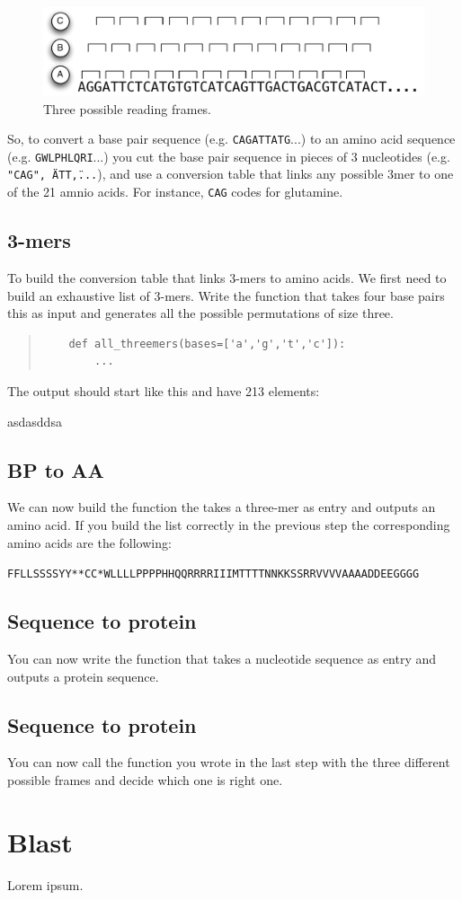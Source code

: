 \documentclass[a4paper,11pt]{article}
\begin{document}
\begin{figure}[h!]
	\centering
	\includegraphics[width=1.0\textwidth]{reading_frame.pdf}
	\caption{Three possible reading frames.}
	\label{fig:gene_distribution_rib}
\end{figure}

So, to convert a base pair sequence (e.g. \texttt{CAGATTATG}...) to an amino acid sequence (e.g. \texttt{GWLPHLQRI}...) you cut the base pair sequence in pieces of 3 nucleotides (e.g. \texttt{"CAG", \"ATT\",...}), and use a conversion table that links any possible 3mer to one of the 21 amnio acids. For instance, \texttt{CAG} codes for glutamine.

\subsection{3-mers}
To build the conversion table that links 3-mers to amino acids. We first need to build an exhaustive list of 3-mers. Write the function that takes four base pairs this as input and generates all the possible permutations of size three.

\begin{quote}
\begin{verbatim}
	def all_threemers(bases=['a','g','t','c']):
		...
\end{verbatim}
\end{quote}
	
The output should start like this and have 213 elements:

asdasddsa

\subsection{BP to AA}
We can now build the function the takes a three-mer as entry and outputs an amino acid. If you build the list correctly in the previous step the corresponding amino acids are the following:

\texttt{FFLLSSSSYY**CC*WLLLLPPPPHHQQRRRRIIIMTTTTNNKKSSRRVVVVAAAADDEEGGGG}

\subsection{Sequence to protein}
You can now write the function that takes a nucleotide sequence as entry and outputs a protein sequence.

\subsection{Sequence to protein}
You can now call the function you wrote in the last step with the three different possible frames and decide which one is right one.

\section{Blast}
Lorem ipsum.
\end{document}
